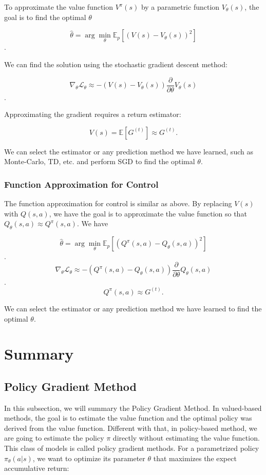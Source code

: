 \documentclass[11pt]{article}
\begin{document}
To approximate the value function $V^\pi(s)$ by a parametric function $V_\theta(s)$, the goal is to find the optimal $\theta$ 

$$\hat{\theta} = \arg \min_\theta \mathbb{E}_p[(V(s)-V_\theta(s))^2]$$.

We can find the solution using the stochastic gradient descent method:

$$\nabla_\theta \mathcal{L}_\theta \approx -(V(s)-V_\theta(s))\frac{\partial}{\partial \theta} V_\theta(s)$$.

Approximating the gradient requires a return estimator:

$$V(s) = \mathbb{E}[G^{(t)}] \approx G^{(t)}.$$

We can select the estimator or any prediction method we have learned, such as Monte-Carlo, TD, etc. and perform SGD to find the optimal $\theta$.

\subsubsection{Function Approximation for Control}

The function approximation for control is similar as above. By replacing $V(s)$ with $Q(s,a)$, we have the goal is to approximate the value function so that $Q_\theta(s,a) \approx Q^\pi(s,a).$ We have 

$$\hat{\theta} = \arg \min_\theta \mathbb{E}_p[(Q^\pi(s,a)-Q_\theta(s,a))^2]$$.
$$\nabla_\theta \mathcal{L}_\theta \approx -(Q^\pi(s,a)-Q_\theta(s,a))\frac{\partial}{\partial \theta} Q_\theta(s,a)$$.
$$Q^\pi(s,a) \approx G^{(t)}.$$

We can select the estimator or any prediction method we have learned to find the optimal $\theta$.

\section{Summary}
\subsection{Policy Gradient Method}
In this subsection, we will summary the Policy Gradient Method. In valued-based methods, the goal is to estimate the value function and the optimal policy was derived from the value function. Different with that, in policy-based method, we are going to estimate the policy $\pi$ directly without estimating the value function. This class of models is called policy gradient methods. For a parametrized policy $\pi_\theta(a|s)$, we want to optimize its parameter $\theta$ that maximizes the expect accumulative return:
\end{document}
